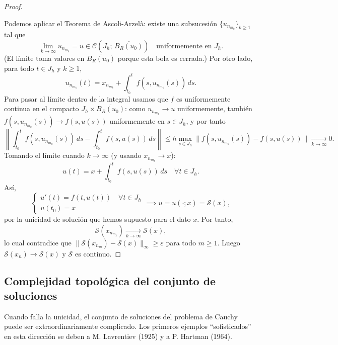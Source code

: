 \begin{proof}
\begin{itemize}
    \end{itemize}
    Podemos aplicar el Teorema de Ascoli-Arzelà: existe una subsucesión $\{u_{n_{m_k}}\}_{k \geq 1}$ tal que
    \[
        \lim_{k \to \infty} u_{n_{m_k}} = u \in \mathcal{C}(J_h; \, \overline{B_R(u_0)}) \quad \text{uniformemente en } J_h.
    \]
    (El límite toma valores en $\overline{B_R(u_0)}$ porque esta bola es cerrada.) Por otro lado, para todo $t \in J_h$ y $k \geq 1$,
    \[
        u_{n_{m_k}}(t) = x_{n_{m_k}} + \int_{t_0}^{t} f(s, u_{n_{m_k}}(s)) \, ds.
    \]
    Para pasar al límite dentro de la integral usamos que $f$ es uniformemente continua en el compacto $J_h \times \overline{B_R(u_0)}$: como $u_{n_{m_k}} \to u$ uniformemente, también $f(s, u_{n_{m_k}}(s)) \to f(s, u(s))$ uniformemente en $s \in J_h$, y por tanto
    \[
        \left\| \int_{t_0}^{t} f(s, u_{n_{m_k}}(s)) \, ds - \int_{t_0}^{t} f(s, u(s)) \, ds \right\| \leq h \max_{s \in J_h} \| f(s, u_{n_{m_k}}(s)) - f(s, u(s)) \| \xrightarrow[k \to \infty]{} 0.
    \]
    Tomando el límite cuando $k \to \infty$ (y usando $x_{n_{m_k}} \to x$):
    \[
        u(t) = x + \int_{t_0}^{t} f(s, u(s)) \, ds \quad \forall t \in J_h.
    \]
    Así,
    \[
        \begin{cases}
            u'(t) = f(t, u(t)) \quad \forall t \in J_h \\
            u(t_0) = x
        \end{cases}
        \implies u = u(\cdot; x) = \mathcal{S}(x),
    \]
    por la unicidad de solución que hemos supuesto para el dato $x$. Por tanto,
    \[
        \mathcal{S}(x_{n_{m_k}}) \xrightarrow[k \to \infty]{} \mathcal{S}(x),
    \]
    lo cual contradice que $\| \mathcal{S}(x_{n_m}) - \mathcal{S}(x) \|_\infty \geq \varepsilon$ para todo $m \geq 1$. Luego $\mathcal{S}(x_n) \to \mathcal{S}(x)$ y $\mathcal{S}$ es continuo.
\end{proof}

\subsection{Complejidad topológica del conjunto de soluciones}

Cuando falla la unicidad, el conjunto de soluciones del problema de Cauchy puede ser extraordinariamente complicado. Los primeros ejemplos ``sofisticados'' en esta dirección se deben a M. Lavrentiev (1925) y a P. Hartman (1964).


